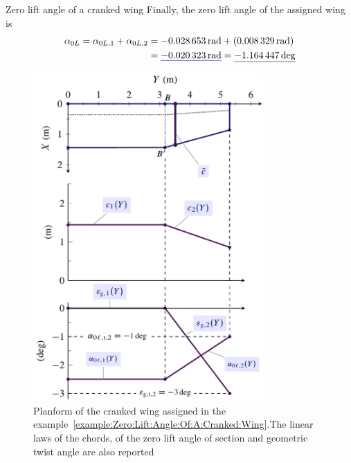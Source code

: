 \documentclass[[12pt,twoside]{book}
\begin{document}
\begin{myExampleX}{Zero lift angle of a cranked wing}{}
Finally, the zero lift angle of the assigned wing is
\[
\begin{split}
\alpha_{0L} = \alpha_{0L,1} + \alpha_{0L,2} 
  & {}= \SI[round-precision=4]{\myAlphaZeroLiftWingIRAD}{\radian}
    + ( \SI[round-precision=5]{\myAlphaZeroLiftWingIIRAD}{\radian} )
\\
  & {}= \mathunderline{mydarkblue}{ \SI[round-precision=4]{\myAlphaZeroLiftWingRAD}{\radian} }
    = \mathunderline{mydarkblue}{ \SI[round-precision=2]{\myAlphaZeroLiftWingDEG}{\deg} }
\end{split}
\]
%
\begin{figure}[t]%
  \centering
    \includegraphics[width=0.78\textwidth]{Chapter_2/zero_lift_angle_of_a_cranked_wing/wing_alpha_zero_lift_1A_drawing.pdf}
  \caption{
           Planform of the cranked wing assigned in the example~\ref{example:Zero:Lift:Angle:Of:A:Cranked:Wing}.The linear laws of the chords, of the zero lift angle of section and geometric twist angle are also reported
 }
  \label{fig:Zero:Lift:Cranked}%
\end{figure}
%
\end{myExampleX}
\end{document}

